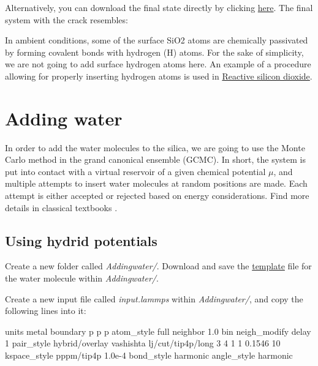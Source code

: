 \vspace{0.25cm} \noindent Alternatively, you
can download the final state directly by clicking
\href{https://lammpstutorials.github.io/lammpstutorials-inputs/level3/water-adsorption-in-silica/Cracking/dilatedSiO.data}{here}. The final system with the crack resembles:

\begin{tcolorbox}[colback=mylightblue!5!white,colframe=mylightblue!75!black,title=Passivated silica]

\vspace{0.25cm} \noindent In ambient conditions, some of the surface SiO2 atoms are chemically
passivated by forming covalent bonds with hydrogen (H)
atoms. For the sake of simplicity, we are not going to
add surface hydrogen atoms here. An example of a procedure allowing
for properly inserting hydrogen atoms is used
in \hyperref[reactive-silicon-dioxide-label]{Reactive silicon dioxide}.
\end{tcolorbox}

\noindent \section{Adding water}
In order to add the water molecules to the silica, we are
going to use the Monte Carlo method in the grand canonical
ensemble (GCMC). In short, the system is put into contact
with a virtual reservoir of a given chemical potential
$\mu$, and multiple attempts to insert water
molecules at random positions are made. Each attempt is
either accepted or rejected based on energy considerations. Find more details
in classical textbooks \cite{frenkel2023understanding}.

\subsection{Using hydrid potentials}
\noindent Create a new folder called \textit{Addingwater/}. Download and save the
\href{https://lammpstutorials.github.io/lammpstutorials-inputs/level3/water-adsorption-in-silica/AddingWater/H2O.mol}{template} file for the
water molecule within \textit{Addingwater/}.

\vspace{0.25cm} \noindent Create a new input file called \textit{input.lammps}
within \textit{Addingwater/}, and copy the
following lines into it:

\begin{lcverbatim}
units metal
boundary p p p
atom_style full
neighbor 1.0 bin
neigh_modify delay 1
pair_style hybrid/overlay vashishta lj/cut/tip4p/long 3 4 1 1 0.1546 10
kspace_style pppm/tip4p 1.0e-4
bond_style harmonic
angle_style harmonic
\end{lcverbatim}

